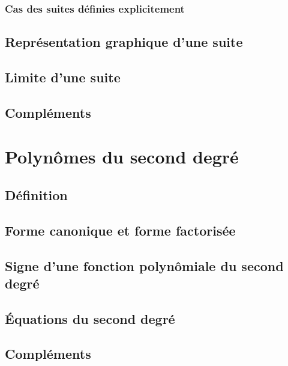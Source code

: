 \subsubsection{Cas des suites définies explicitement}

\subsection{Représentation graphique d'une suite}

\subsection{Limite d'une suite}

\subsection{Compléments}

\newpage
\section[Polynômes du second degré]{Polynômes du second degré}

\subsection{Définition}

\subsection{Forme canonique et forme factorisée}

\subsection{Signe d'une fonction polynômiale du second degré}

\subsection{Équations du second degré}

\subsection{Compléments}

